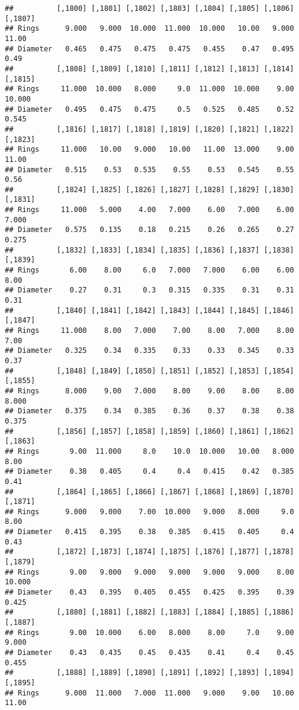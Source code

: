 \documentclass[
]{article}
\begin{document}
\begin{verbatim}
##          [,1800] [,1801] [,1802] [,1803] [,1804] [,1805] [,1806] [,1807]
## Rings      9.000   9.000  10.000  11.000  10.000   10.00   9.000   11.00
## Diameter   0.465   0.475   0.475   0.475   0.455    0.47   0.495    0.49
##          [,1808] [,1809] [,1810] [,1811] [,1812] [,1813] [,1814] [,1815]
## Rings     11.000  10.000   8.000     9.0  11.000  10.000    9.00  10.000
## Diameter   0.495   0.475   0.475     0.5   0.525   0.485    0.52   0.545
##          [,1816] [,1817] [,1818] [,1819] [,1820] [,1821] [,1822] [,1823]
## Rings     11.000   10.00   9.000   10.00   11.00  13.000    9.00   11.00
## Diameter   0.515    0.53   0.535    0.55    0.53   0.545    0.55    0.56
##          [,1824] [,1825] [,1826] [,1827] [,1828] [,1829] [,1830] [,1831]
## Rings     11.000   5.000    4.00   7.000    6.00   7.000    6.00   7.000
## Diameter   0.575   0.135    0.18   0.215    0.26   0.265    0.27   0.275
##          [,1832] [,1833] [,1834] [,1835] [,1836] [,1837] [,1838] [,1839]
## Rings       6.00    8.00     6.0   7.000   7.000    6.00    6.00    8.00
## Diameter    0.27    0.31     0.3   0.315   0.335    0.31    0.31    0.31
##          [,1840] [,1841] [,1842] [,1843] [,1844] [,1845] [,1846] [,1847]
## Rings     11.000    8.00   7.000    7.00    8.00   7.000    8.00    7.00
## Diameter   0.325    0.34   0.335    0.33    0.33   0.345    0.33    0.37
##          [,1848] [,1849] [,1850] [,1851] [,1852] [,1853] [,1854] [,1855]
## Rings      8.000    9.00   7.000    8.00    9.00    8.00    8.00   8.000
## Diameter   0.375    0.34   0.385    0.36    0.37    0.38    0.38   0.375
##          [,1856] [,1857] [,1858] [,1859] [,1860] [,1861] [,1862] [,1863]
## Rings       9.00  11.000     8.0    10.0  10.000   10.00   8.000    8.00
## Diameter    0.38   0.405     0.4     0.4   0.415    0.42   0.385    0.41
##          [,1864] [,1865] [,1866] [,1867] [,1868] [,1869] [,1870] [,1871]
## Rings      9.000   9.000    7.00  10.000   9.000   8.000     9.0    8.00
## Diameter   0.415   0.395    0.38   0.385   0.415   0.405     0.4    0.43
##          [,1872] [,1873] [,1874] [,1875] [,1876] [,1877] [,1878] [,1879]
## Rings       9.00   9.000   9.000   9.000   9.000   9.000    8.00  10.000
## Diameter    0.43   0.395   0.405   0.455   0.425   0.395    0.39   0.425
##          [,1880] [,1881] [,1882] [,1883] [,1884] [,1885] [,1886] [,1887]
## Rings       9.00  10.000    6.00   8.000    8.00     7.0    9.00   9.000
## Diameter    0.43   0.435    0.45   0.435    0.41     0.4    0.45   0.455
##          [,1888] [,1889] [,1890] [,1891] [,1892] [,1893] [,1894] [,1895]
## Rings      9.000  11.000   7.000  11.000   9.000    9.00   10.00   11.00

\end{verbatim}
\end{document}
